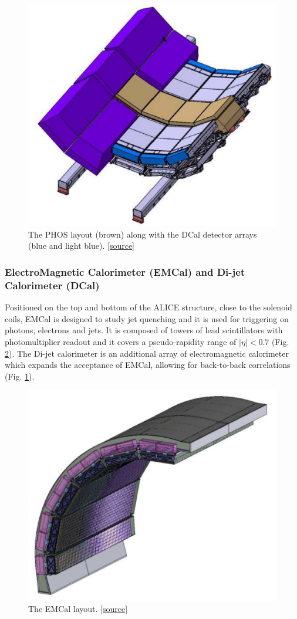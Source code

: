 \begin{figure}[!h]
\begin{center}
\includegraphics[width=0.5\linewidth]{Chapters/Introduction/Figs/phos.pdf}
\caption{The PHOS layout (brown) along with the DCal detector arrays (blue and light blue). \href{http://alice.web.cern.ch/detectors/more-details-alice-dcal}{[source]}}
\label{fig:PHOS}
\end{center}
\end{figure}

\subsubsection{ElectroMagnetic Calorimeter (EMCal) and Di-jet Calorimeter (DCal)}
Positioned on the top and bottom of the ALICE structure, close to the solenoid coils, EMCal is designed to study jet quenching and it is used for triggering on photons, electrons and jets.
It is composed of towers of lead scintillators with photomultiplier readout and it covers a pseudo-rapidity range of $|\eta| < 0.7$ (Fig. \ref{fig:EMCAL}).
The Di-jet calorimeter is an additional array of electromagnetic calorimeter which expands the acceptance of EMCal, allowing for back-to-back correlations (Fig. \ref{fig:PHOS}).

\begin{figure}[!h]
\begin{center}
\includegraphics[width=0.5\linewidth]{Chapters/Introduction/Figs/emcal.pdf}
\caption{The EMCal layout. \href{https://trac.cc.jyu.fi/projects/alice/wiki/EMCAL}{[source]}}
\label{fig:EMCAL}
\end{center}
\end{figure}

